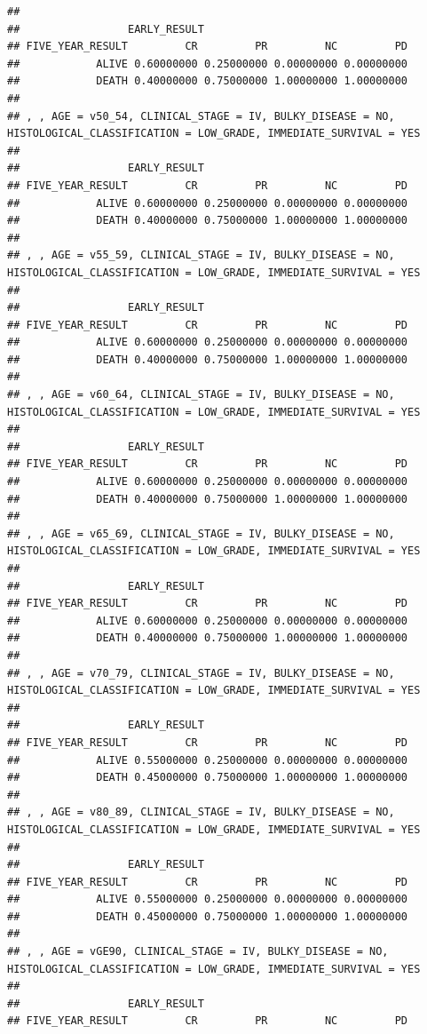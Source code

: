 \documentclass[]{article}
\begin{document}
\begin{verbatim}
## 
##                 EARLY_RESULT
## FIVE_YEAR_RESULT         CR         PR         NC         PD
##            ALIVE 0.60000000 0.25000000 0.00000000 0.00000000
##            DEATH 0.40000000 0.75000000 1.00000000 1.00000000
## 
## , , AGE = v50_54, CLINICAL_STAGE = IV, BULKY_DISEASE = NO, HISTOLOGICAL_CLASSIFICATION = LOW_GRADE, IMMEDIATE_SURVIVAL = YES
## 
##                 EARLY_RESULT
## FIVE_YEAR_RESULT         CR         PR         NC         PD
##            ALIVE 0.60000000 0.25000000 0.00000000 0.00000000
##            DEATH 0.40000000 0.75000000 1.00000000 1.00000000
## 
## , , AGE = v55_59, CLINICAL_STAGE = IV, BULKY_DISEASE = NO, HISTOLOGICAL_CLASSIFICATION = LOW_GRADE, IMMEDIATE_SURVIVAL = YES
## 
##                 EARLY_RESULT
## FIVE_YEAR_RESULT         CR         PR         NC         PD
##            ALIVE 0.60000000 0.25000000 0.00000000 0.00000000
##            DEATH 0.40000000 0.75000000 1.00000000 1.00000000
## 
## , , AGE = v60_64, CLINICAL_STAGE = IV, BULKY_DISEASE = NO, HISTOLOGICAL_CLASSIFICATION = LOW_GRADE, IMMEDIATE_SURVIVAL = YES
## 
##                 EARLY_RESULT
## FIVE_YEAR_RESULT         CR         PR         NC         PD
##            ALIVE 0.60000000 0.25000000 0.00000000 0.00000000
##            DEATH 0.40000000 0.75000000 1.00000000 1.00000000
## 
## , , AGE = v65_69, CLINICAL_STAGE = IV, BULKY_DISEASE = NO, HISTOLOGICAL_CLASSIFICATION = LOW_GRADE, IMMEDIATE_SURVIVAL = YES
## 
##                 EARLY_RESULT
## FIVE_YEAR_RESULT         CR         PR         NC         PD
##            ALIVE 0.60000000 0.25000000 0.00000000 0.00000000
##            DEATH 0.40000000 0.75000000 1.00000000 1.00000000
## 
## , , AGE = v70_79, CLINICAL_STAGE = IV, BULKY_DISEASE = NO, HISTOLOGICAL_CLASSIFICATION = LOW_GRADE, IMMEDIATE_SURVIVAL = YES
## 
##                 EARLY_RESULT
## FIVE_YEAR_RESULT         CR         PR         NC         PD
##            ALIVE 0.55000000 0.25000000 0.00000000 0.00000000
##            DEATH 0.45000000 0.75000000 1.00000000 1.00000000
## 
## , , AGE = v80_89, CLINICAL_STAGE = IV, BULKY_DISEASE = NO, HISTOLOGICAL_CLASSIFICATION = LOW_GRADE, IMMEDIATE_SURVIVAL = YES
## 
##                 EARLY_RESULT
## FIVE_YEAR_RESULT         CR         PR         NC         PD
##            ALIVE 0.55000000 0.25000000 0.00000000 0.00000000
##            DEATH 0.45000000 0.75000000 1.00000000 1.00000000
## 
## , , AGE = vGE90, CLINICAL_STAGE = IV, BULKY_DISEASE = NO, HISTOLOGICAL_CLASSIFICATION = LOW_GRADE, IMMEDIATE_SURVIVAL = YES
## 
##                 EARLY_RESULT
## FIVE_YEAR_RESULT         CR         PR         NC         PD

\end{verbatim}
\end{document}
